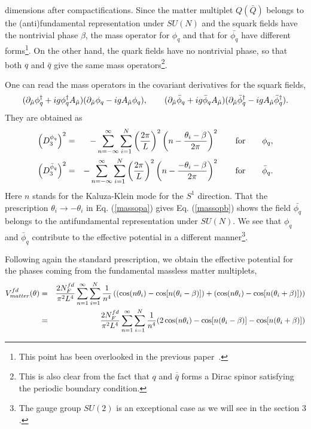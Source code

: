 \documentclass[a4paper,12pt]{article}
\begin{document}
dimensions after compactifications. 
Since the matter multiplet $Q ({\bar Q})$ belongs to the (anti)fundamental
representation under $SU(N)$ and the squark fields
have the nontrivial phase $\beta$, the mass operator for $\phi_q$ 
and that for $\bar{\phi_q}$ have different 
forms\footnote{This point has 
been overlooked in the previous paper~\cite{takenaga}.}. On the other 
hand, the quark fields have no nontrivial phase, so that 
both $q$ and $\bar q$ give the same mass 
operators\footnote{This is also clear from the fact that $q$ 
and $\overline{\bar q}$ forms a Dirac spinor satisfying the periodic 
boundary condition.}.
\par
One can read the mass operators in the covariant derivatives for
the squark fields,
\begin{equation}
(\partial_{\hat\mu}\phi_q^{\dagger}+ig\phi_q^{\dagger}A_{\hat\mu})
(\partial_{\hat\mu}\phi_q-ig A_{\hat\mu}\phi_q), \qquad
(\partial_{\hat\mu}{\bar\phi}_q+ig{\bar\phi}_qA_{\hat\mu})
(\partial_{\hat\mu}{\bar\phi}_q^{\dagger}-ig A_{\hat\mu}{\bar\phi}_q^{\dagger}).
\end{equation}
They are obtained as 
\begin{eqnarray}
\left(D_3^{\phi_q}\right)^2&=&-\sum_{n=-\infty}^{\infty}
\sum_{i=1}^{N}\left({{2\pi}\over{L}}\right)^2
\left(n-{{\theta_i-\beta}\over {2\pi}}\right)^2
\qquad {\rm for}\qquad \phi_q, \label{massopa}\\
\left(D_3^{\bar{\phi}_q}\right)^2&=&
-\sum_{n=-\infty}^{\infty}\sum_{i=1}^{N}
\left({{2\pi}\over{L}}\right)^2\left(n-{{-\theta_i-\beta}\over {2\pi}}
\right)^2
\qquad {\rm for}\qquad {\bar\phi_q}. 
\label{massopb}
\end{eqnarray}  
Here $n$ stands for the Kaluza-Klein mode for the $S^1$ direction.
That the prescription $\theta_i\rightarrow -\theta_i$
in Eq. (\ref{massopa}) gives Eq. (\ref{massopb}) shows
the field $\bar{\phi_q}$ belongs to the antifundamental 
representation under $SU(N)$. We see that  
$\phi_q$ and ${\bar\phi}_q$ contribute to 
the effective potential 
in a different manner\footnote{The gauge group $SU(2)$ is an exceptional
case as we will see in the section $3$.}.
\par
Following again the standard prescription, we obtain the effective potential
for the phases coming from the fundamental massless matter multiplets,
\begin{eqnarray}
V_{matter}^{fd}(\theta)&=&
{{2N_F^{fd}}\over{\pi^2L^4}}\sum_{n=1}^{\infty}
\sum_{i=1}^{N}{1\over n^4}\left((\cos(n\theta_i)-\cos[n(\theta_i-\beta)])
+(\cos(n\theta_i)-\cos[n(\theta_i+\beta)])\right)\nonumber\\
&=& 
{{2N_F^{fd}}\over{\pi^2L^4}}\sum_{n=1}^{\infty}
\sum_{i=1}^{N}{1\over n^4}(2\cos(n\theta_i)-\cos[n(\theta_i-\beta)]
-\cos[n(\theta_i+\beta)])
\label{fdeff}
\end{eqnarray}
\end{document}
